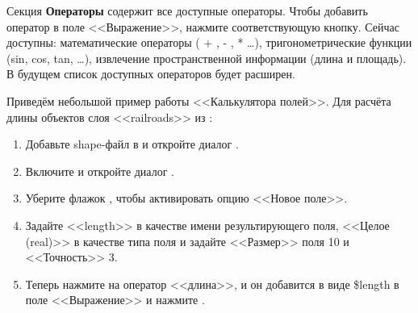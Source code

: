 Секция \textbf{Операторы} содержит все доступные операторы. Чтобы добавить
оператор в поле <<Выражение>>, нажмите соответствующую кнопку. Сейчас
доступны: математические операторы ( + , - , * \ldots), тригонометрические
функции (sin, cos, tan, \ldots), извлечение пространственной информации
(длина и площадь). В будущем список доступных операторов будет расширен.

Приведём небольшой пример работы <<Калькулятора полей>>. Для расчёта
длины объектов слоя <<railroads>> из :

\begin{enumerate}
\item Добавьте shape-файл  в \qg и откройте
диалог .
\item Включите  и
откройте диалог .
\item Уберите флажок , чтобы активировать
опцию <<Новое поле>>.
\item Задайте <<length>> в качестве имени результирующего поля, <<Целое (real)>>
в качестве типа поля и задайте <<Размер>> поля 10 и <<Точность>> 3.
\item Теперь нажмите на оператор <<длина>>, и он добавится в виде \$length в
поле <<Выражение>> и нажмите .
\end{enumerate}
